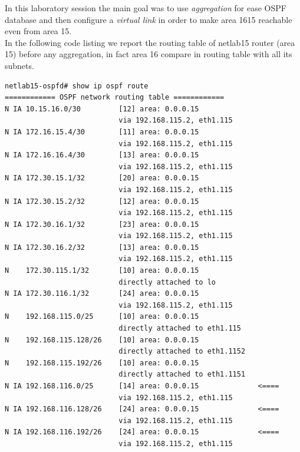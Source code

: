 \documentclass{llncs}
\begin{document}
In this laboratory session the main goal was to use \emph{aggregation} for ease OSPF database and then configure a \emph{virtual link} in order to make area 1615 reachable even from area 15.\\
In the following code listing we report the routing table of netlab15 router (area 15) before any aggregation, in fact area 16 compare in routing table with all its subnets. 
\\
\lstset{language=sh, caption=Routing table of router 192.168.115.1 ,  basicstyle=\ttfamily\scriptsize , breaklines=true}
\begin{lstlisting}
netlab15-ospfd# show ip ospf route    
============ OSPF network routing table ============
N IA 10.15.16.0/30         [12] area: 0.0.0.15
                           via 192.168.115.2, eth1.115
N IA 172.16.15.4/30        [11] area: 0.0.0.15
                           via 192.168.115.2, eth1.115
N IA 172.16.16.4/30        [13] area: 0.0.0.15
                           via 192.168.115.2, eth1.115
N IA 172.30.15.1/32        [20] area: 0.0.0.15
                           via 192.168.115.2, eth1.115
N IA 172.30.15.2/32        [12] area: 0.0.0.15
                           via 192.168.115.2, eth1.115
N IA 172.30.16.1/32        [23] area: 0.0.0.15
                           via 192.168.115.2, eth1.115
N IA 172.30.16.2/32        [13] area: 0.0.0.15				
                           via 192.168.115.2, eth1.115
N    172.30.115.1/32       [10] area: 0.0.0.15
                           directly attached to lo
N IA 172.30.116.1/32       [24] area: 0.0.0.15				
                           via 192.168.115.2, eth1.115
N    192.168.115.0/25      [10] area: 0.0.0.15
                           directly attached to eth1.115
N    192.168.115.128/26    [10] area: 0.0.0.15
                           directly attached to eth1.1152
N    192.168.115.192/26    [10] area: 0.0.0.15
                           directly attached to eth1.1151
N IA 192.168.116.0/25      [14] area: 0.0.0.15				<====
                           via 192.168.115.2, eth1.115
N IA 192.168.116.128/26    [24] area: 0.0.0.15				<====
                           via 192.168.115.2, eth1.115
N IA 192.168.116.192/26    [24] area: 0.0.0.15				<====
                           via 192.168.115.2, eth1.115
\end{lstlisting}
\end{document}
